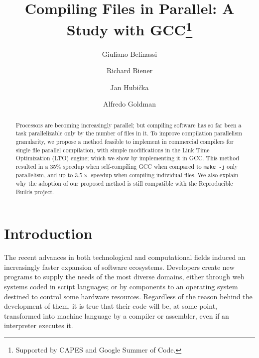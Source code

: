 \documentclass[runningheads]{llncs}
\begin{document}


%
\title{Compiling Files in Parallel: A Study with GCC\thanks{Supported by CAPES and Google Summer of Code.}}
%
%
\author{Giuliano Belinassi \and Richard Biener \and Jan Hubi\v cka  \and Alfredo Goldman}
%
%

%
\maketitle              %
%
\begin{abstract}

Processors are becoming increasingly parallel; but compiling software has so
far been a task parallelizable only by the number of files in it. To improve
compilation parallelism granularity, we propose a method feasible to implement
in commercial compilers for single file parallel compilation, with simple
modifications in the Link Time Optimization (LTO) engine; which we show by
implementing it in GCC. This method resulted in a 35\% speedup when
self-compiling GCC when compared to \texttt{make -j} only parallelism, and
up to $3.5\times$ speedup when compiling individual files. 
We also explain why the adoption of our proposed method is still compatible
with the Reproducible Builds project.

\end{abstract}
%
%
%
\section{Introduction}

The recent advances in both technological and computational fields induced an
increasingly faster expansion of software ecosystems. Developers create new
programs to supply the needs of the most diverse domains, either through web
systems coded in script languages; or by components to an operating system
destined to control some hardware resources. Regardless of the reason behind
the development of them, it is true that their code will be, at some
point, transformed into machine language by a compiler or assembler, even if an
interpreter executes it.
\end{document}
